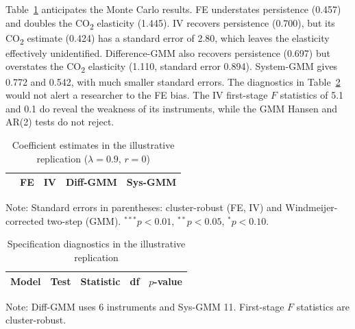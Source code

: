 \documentclass[11pt,a4paper]{article}
\newcommand{\COtwo}{CO\textsubscript{2}}
\begin{document}
Table~\ref{tab:single} anticipates the Monte Carlo results. FE understates persistence (0.457) and doubles the \COtwo{} elasticity (1.445). IV recovers persistence (0.700), but its \COtwo{} estimate (0.424) has a standard error of 2.80, which leaves the elasticity effectively unidentified. Difference-GMM also recovers persistence (0.697) but overstates the \COtwo{} elasticity (1.110, standard error 0.894). System-GMM gives 0.772 and 0.542, with much smaller standard errors. The diagnostics in Table~\ref{tab:diag} would not alert a researcher to the FE bias. The IV first-stage $F$ statistics of 5.1 and 0.1 do reveal the weakness of its instruments, while the GMM Hansen and AR(2) tests do not reject.

\begin{table}[htbp]
\centering
\begin{threeparttable}
\caption{Coefficient estimates in the illustrative replication ($\lambda=0.9$, $r=0$)}\label{tab:single}
\small
\begin{tabular}{@{}lcccc@{}}
\toprule
 & FE & IV & Diff-GMM & Sys-GMM \\
\midrule
\bottomrule
\end{tabular}
\begin{tablenotes}\footnotesize
\item Note: Standard errors in parentheses: cluster-robust (FE, IV) and Windmeijer-corrected two-step (GMM). $^{***}p<0.01$, $^{**}p<0.05$, $^{*}p<0.10$.
\end{tablenotes}
\end{threeparttable}
\end{table}

\begin{table}[htbp]
\centering
\begin{threeparttable}
\caption{Specification diagnostics in the illustrative replication}\label{tab:diag}
\small
\begin{tabular}{@{}llrrr@{}}
\toprule
Model & Test & Statistic & df & $p$-value \\
\midrule
\bottomrule
\end{tabular}
\begin{tablenotes}\footnotesize
\item Note: Diff-GMM uses 6 instruments and Sys-GMM 11. First-stage $F$ statistics are cluster-robust.
\end{tablenotes}
\end{threeparttable}
\end{table}
\end{document}
